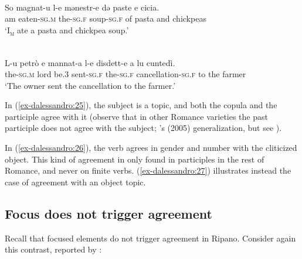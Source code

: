 \documentclass[output=paper
,modfonts
,nonflat]{langsci/langscibook}
\begin{document}
\begin{exe}
	\ex\label{ex-dalessandro:25} \citet[71]{Rossi2008}\\
	\gll So   magnat-u   l-e     mənestr-e   də paste e cicia.\\
	am  eaten-\textsc{sg.m}  the-\textsc{sg.f} soup-\textsc{sg.f} of pasta and chickpeas\\ 
	\glt `I\textsc{\textsubscript{m}} ate a pasta and chickpea soup.'
\end{exe}
\begin{exe}
	\ex\label{ex-dalessandro:26} \citet[394]{Harder1998} 
	\endxlist
\end{exe}
\begin{exe}
	\ex \label{ex-dalessandro:27}\citet[93]{Rossi2008}\\
	\gll L-u     petrò e   mannat-a l-e   disdett-e     a lu cuntedì.\\
	the-\textsc{sg.m}  lord  be.3  sent-\textsc{sg.f} the-\textsc{sg.f} cancellation-\textsc{sg.f} to the farmer\\ 
	\glt `The owner sent the cancellation to the farmer.'
\end{exe}
In (\ref{ex-dalessandro:25}), the subject is a topic, and both the copula and the participle agree with it (observe that in other Romance varieties the past participle does not agree with the subject; \citeauthor{Belletti2005}'s (2005) generalization, but see \citealt{D`Alessandro_Roberts2010}).

In (\ref{ex-dalessandro:26}), the verb agrees in gender and number with the cliticized object. This kind of agreement in only found in participles in the rest of Romance, and never on finite verbs. (\ref{ex-dalessandro:27}) illustrates instead the case of agreement with an object topic. 

\subsection{Focus does not trigger agreement} \label{sec-dalessandro:4.3}
Recall that focused elements do not trigger agreement in Ripano. Consider again this contrast, reported by \citet{Paciaroni2017}:
\end{document}
